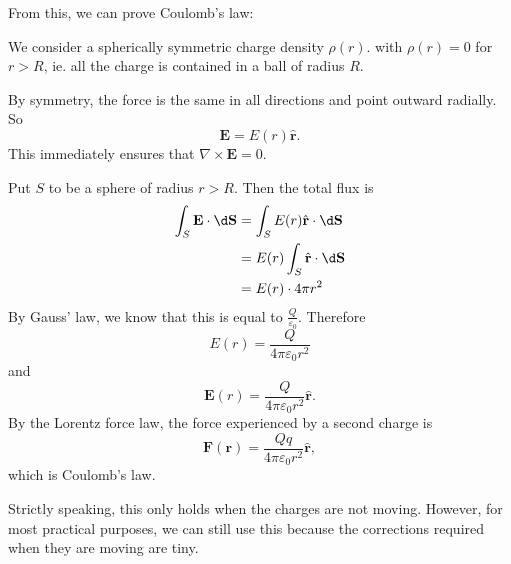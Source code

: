 \documentclass[a4paper]{article}
\begin{document}
From this, we can prove Coulomb's law:
\begin{eg}
  We consider a spherically symmetric charge density $\rho (r)$. with $\rho (r) = 0$ for $r > R$, ie. all the charge is contained in a ball of radius $R$.
  \begin{center}
  \end{center}
  By symmetry, the force is the same in all directions and point outward radially. So
  \[
    \mathbf{E} = E(r) \hat{\mathbf{r}}.
  \]
  This immediately ensures that $\nabla \times \mathbf{E} = 0$.

  Put $S$ to be a sphere of radius $r > R$. Then the total flux is
  \begin{align*}
    \int_S \mathbf{E}\cdot \d \mathbf{S} &= \int_S E(r) \hat{\mathbf{r}}\cdot \d \mathbf{S}\\
    &= E(r) \int_S \hat{\mathbf{r}}\cdot \d \mathbf{S}\\
    &= E(r)\cdot 4\pi r^2
  \end{align*}
  By Gauss' law, we know that this is equal to $\frac{Q}{\varepsilon_0}$. Therefore
  \[
    E(r) = \frac{Q}{4\pi \varepsilon_0 r^2}
  \]
  and
  \[
    \mathbf{E}(r) = \frac{Q}{4\pi\varepsilon_0 r^2}\hat{\mathbf{r}}.
  \]
  By the Lorentz force law, the force experienced by a second charge is
  \[
    \mathbf{F}(\mathbf{r}) = \frac{Qq}{4\pi\varepsilon_0 r^2}\hat{\mathbf{r}},
  \]
  which is Coulomb's law.

  Strictly speaking, this only holds when the charges are not moving. However, for most practical purposes, we can still use this because the corrections required when they are moving are tiny.
\end{eg}
\end{document}
